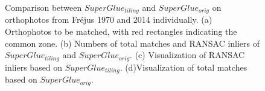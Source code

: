 \begin{figure}[htbp]
\begin{center}
{\begin{minipage}[t]{0.48\linewidth}
			\end{minipage}%
		}
		\caption{Comparison between $SuperGlue_{tiling}$ and $SuperGlue_{orig}$ on orthophotos from Fr{\'e}jus 1970 and 2014 individually. (a) Orthophotos to be matched, with red rectangles indicating the common zone. (b) Numbers of total matches and RANSAC inliers of $SuperGlue_{tiling}$ and $SuperGlue_{orig}$. (c) Visualization of RANSAC inliers based on $SuperGlue_{tiling}$. (d)Visualization of total matches based on $SuperGlue_{orig}$.}
		\label{MatchOrtho}
	\end{center}
\end{figure} 

